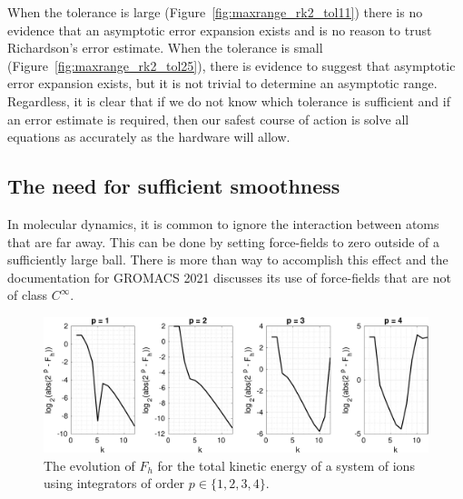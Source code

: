 \documentclass[runningheads]{llncs}
\begin{document}
When the tolerance is large (Figure~\ref{fig:maxrange_rk2_tol11}) there is no evidence that an asymptotic error expansion exists and is no reason to trust Richardson's error estimate. When the tolerance is small (Figure~\ref{fig:maxrange_rk2_tol25}), there is evidence to suggest that asymptotic error expansion exists, but it is not trivial to determine an asymptotic range.  Regardless, it is clear that if we do not know which tolerance is sufficient and if an error estimate is required, then our safest course of action is solve all equations as accurately as the hardware will allow.

\subsection{The need for sufficient smoothness}

In molecular dynamics, it is common to ignore the interaction between atoms that are far away. This can be done by setting force-fields to zero outside of a sufficiently large ball. There is more than way to accomplish this effect and the documentation for GROMACS 2021 discusses its use of force-fields that are not of class $C^{\infty}$.

\begin{figure}[h!]
  \centering
  \includegraphics[width=\linewidth]{iontrap_mwe1.pdf}
  \caption{The evolution of $F_h$ for the total kinetic energy of a system of ions using integrators of order $p \in \{1,2,3,4\}$.}
  \label{fig:iontrap_mwe1}
\end{figure}
\end{document}
